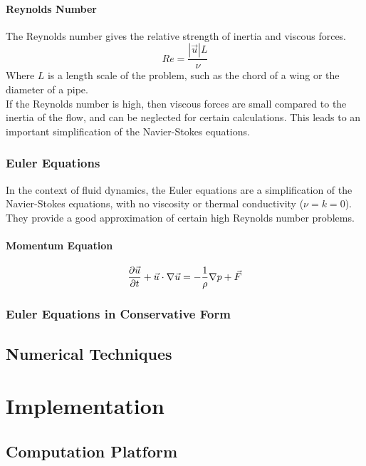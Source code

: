 \documentclass[paper=a4, fontsize=11pt]{scrartcl}
\numberwithin{equation}{section}        %
\numberwithin{figure}{section}          %
\numberwithin{table}{section}               %
\begin{document}
\paragraph{Reynolds Number}
The Reynolds number gives the relative strength of inertia and viscous forces.
\begin{equation}
    Re = \frac{|\vec{u}| L}{\nu}
\end{equation}
Where $L$ is a length scale of the problem, such as the chord of a wing or the diameter of a pipe.\\
If the Reynolds number is high, then viscous forces are small compared to the inertia of the flow, and can be neglected for certain calculations. This leads to an important simplification of the Navier-Stokes equations.

\subsubsection{Euler Equations}
In the context of fluid dynamics, the Euler equations are a simplification of the Navier-Stokes equations, with no viscosity or thermal conductivity ($\nu = k = 0$). They provide a good approximation of certain high Reynolds number problems.

\paragraph{Momentum Equation}
\begin{equation}
    \pdv{\vec{u}}{t} + \vec{u} \cdot \nabla \vec{u} = - \frac{1}{\rho} \nabla p + \vec{F}
\end{equation}

\subsubsection{Euler Equations in Conservative Form}


\subsection{Numerical Techniques}

\section{Implementation}
\subsection{Computation Platform}
\end{document}

